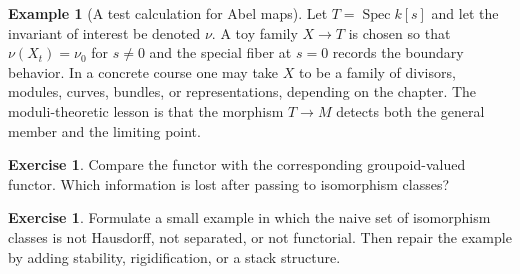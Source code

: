 \documentclass[11pt]{amsart}
\theoremstyle{definition}
\newtheorem{example}[theorem]{Example}
\newtheorem{exercise}[theorem]{Exercise}
\newcommand{\Spec}{\operatorname{Spec}}
\begin{document}
\begin{example}[A test calculation for Abel maps]
Let $T=\Spec k[s]$ and let the invariant of interest be denoted $\nu$.  A toy family $X\to T$ is chosen so that $\nu(X_t)=\nu_0$ for $s\ne0$ and the special fiber at $s=0$ records the boundary behavior.  In a concrete course one may take $X$ to be a family of divisors, modules, curves, bundles, or representations, depending on the chapter.  The moduli-theoretic lesson is that the morphism $T\to M$ detects both the general member and the limiting point.
\end{example}
\begin{exercise}
Compare the functor with the corresponding groupoid-valued functor.  Which information is lost after passing to isomorphism classes?
\end{exercise}
\begin{exercise}
Formulate a small example in which the naive set of isomorphism classes is not Hausdorff, not separated, or not functorial.  Then repair the example by adding stability, rigidification, or a stack structure.
\end{exercise}
\clearpage
\end{document}

